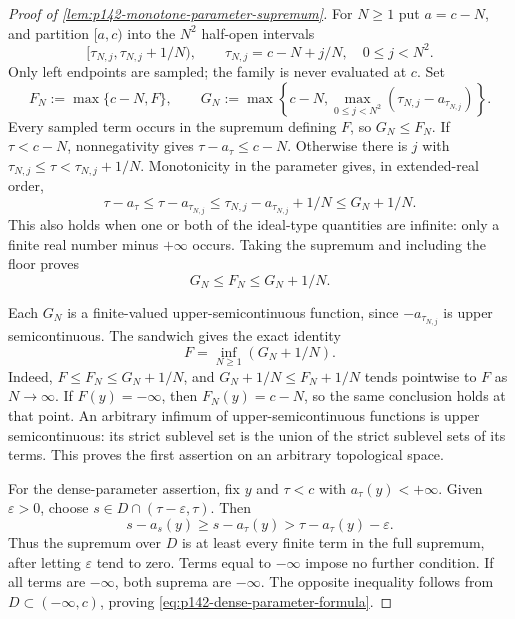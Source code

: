 \begin{proof}[Proof of \cref{lem:p142-monotone-parameter-supremum}]
For $N\geq1$ put $a=c-N$, and partition $[a,c)$ into the $N^2$
half-open intervals
\[
 [\tau_{N,j},\tau_{N,j}+1/N),\qquad
 \tau_{N,j}=c-N+j/N,\quad 0\leq j<N^2.
\]
Only left endpoints are sampled; the family is never evaluated at $c$.
Set
\[
 F_N:=\max\{c-N,F\},\qquad
 G_N:=\max\left\{c-N,
      \max_{0\leq j<N^2}
       (\tau_{N,j}-a_{\tau_{N,j}})\right\}.
\]
Every sampled term occurs in the supremum defining $F$, so $G_N\leq F_N$.
If $\tau<c-N$, nonnegativity gives $\tau-a_\tau\leq c-N$.
Otherwise there is $j$ with
$\tau_{N,j}\leq\tau<\tau_{N,j}+1/N$. Monotonicity in the parameter
gives, in extended-real order,
\[
 \tau-a_\tau
 \leq \tau-a_{\tau_{N,j}}
 \leq \tau_{N,j}-a_{\tau_{N,j}}+1/N
 \leq G_N+1/N.
\]
This also holds when one or both of the ideal-type quantities are infinite:
only a finite real number minus $+\infty$ occurs. Taking the supremum and
including the floor proves
\begin{equation}
             G_N\leq F_N\leq G_N+1/N.
 \label{eq:p142-grid-sandwich}
\end{equation}

Each $G_N$ is a finite-valued upper-semicontinuous function, since
$-a_{\tau_{N,j}}$ is upper semicontinuous. The sandwich gives the exact
identity
\begin{equation}
                  F=\inf_{N\geq1}(G_N+1/N).
 \label{eq:p142-usc-infimum}
\end{equation}
Indeed, $F\leq F_N\leq G_N+1/N$, and
$G_N+1/N\leq F_N+1/N$ tends pointwise to $F$ as $N\to\infty$.
If $F(y)=-\infty$, then $F_N(y)=c-N$, so the same conclusion holds
at that point. An arbitrary infimum of upper-semicontinuous functions is
upper semicontinuous: its strict sublevel set is the union of the strict
sublevel sets of its terms. This proves the first assertion on an
arbitrary topological space.

For the dense-parameter assertion, fix $y$ and $\tau<c$ with
$a_\tau(y)<+\infty$. Given $\varepsilon>0$, choose
$s\in D\cap(\tau-\varepsilon,\tau)$. Then
\[
 s-a_s(y)\geq s-a_\tau(y)
              >\tau-a_\tau(y)-\varepsilon.
\]
Thus the supremum over $D$ is at least every finite term in the full
supremum, after letting $\varepsilon$ tend to zero. Terms equal to
$-\infty$ impose no further condition. If all terms are $-\infty$,
both suprema are $-\infty$. The opposite inequality follows from
$D\subset(-\infty,c)$, proving
\eqref{eq:p142-dense-parameter-formula}.
\end{proof}

